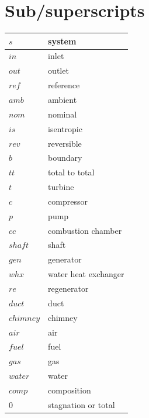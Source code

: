 \documentclass[12pt,a4paper]{report}
\begin{document}
\chapter*{Sub/superscripts}
\begingroup
\setlength{\tabcolsep}{40pt} %
\renewcommand{\arraystretch}{1.2} %
\begin{longtable}[c]{ll}
$s$ & system\\
\endfirsthead
%
\endhead
%
$in$ & inlet\\
$out$ & outlet\\
$ref$ & reference\\
$amb$ & ambient\\
$nom$ & nominal\\
$is$ & isentropic\\
$rev$ & reversible\\
$b$ & boundary\\
$tt$ & total to total\\
$t$ & turbine\\
$c$ & compressor\\
$p$ & pump\\
$cc$ & combustion chamber\\
$shaft$ & shaft\\
$gen$ & generator\\
$whx$ & water heat exchanger\\
$re$ & regenerator\\
$duct$ & duct\\
$chimney$ & chimney\\
$air$ & air\\
$fuel$ & fuel\\
$gas$ & gas\\
$water$ & water\\
$comp$ & composition\\
$0$ & stagnation or total
\end{longtable}
\endgroup
 \pagestyle{fancy}


\newpage

\newpage

\newpage

\newpage

\newpage

\newpage

\newpage


\newpage



\end{document}
